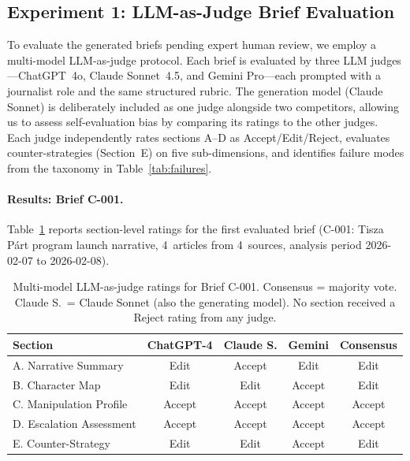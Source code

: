 \documentclass[10pt, a4paper]{article}
\begin{document}
\subsection{Experiment 1: LLM-as-Judge Brief Evaluation}
\label{sec:exp1_brief}

To evaluate the generated briefs pending expert human review, we employ a multi-model LLM-as-judge protocol. Each brief is evaluated by three LLM judges---ChatGPT~4o, Claude Sonnet~4.5, and Gemini Pro---each prompted with a journalist role and the same structured rubric. The generation model (Claude Sonnet) is deliberately included as one judge alongside two competitors, allowing us to assess self-evaluation bias by comparing its ratings to the other judges. Each judge independently rates sections A--D as Accept/Edit/Reject, evaluates counter-strategies (Section~E) on five sub-dimensions, and identifies failure modes from the taxonomy in Table~\ref{tab:failures}.

\paragraph{Results: Brief C-001.}
Table~\ref{tab:judge_brief} reports section-level ratings for the first evaluated brief (C-001: Tisza P\'art program launch narrative, 4~articles from 4~sources, analysis period 2026-02-07 to 2026-02-08).

\begin{table}[!ht]
\begin{center}
\small
\begin{tabular}{lcccc}
  \hline
  \textbf{Section} & \textbf{ChatGPT-4} & \textbf{Claude S.} & \textbf{Gemini} & \textbf{Consensus} \\
  \hline
  A. Narrative Summary    & Edit   & Accept & Edit   & Edit \\
  B. Character Map        & Edit   & Edit   & Accept & Edit \\
  C. Manipulation Profile & Accept & Accept & Accept & Accept \\
  D. Escalation Assessment & Accept & Accept & Accept & Accept \\
  E. Counter-Strategy     & Edit   & Edit   & Accept & Edit \\
  \hline
\end{tabular}
\caption{Multi-model LLM-as-judge ratings for Brief C-001. Consensus = majority vote. Claude S.\ = Claude Sonnet (also the generating model). No section received a Reject rating from any judge.}
\label{tab:judge_brief}
\end{center}
\end{table}
\end{document}
